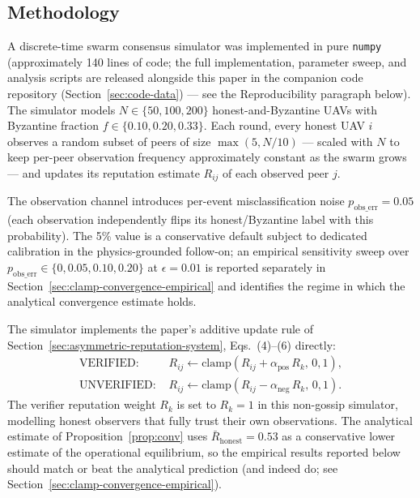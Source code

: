\documentclass[journal,10pt,twocolumn]{IEEEtran}
\begin{document}
\subsection{Methodology}

A discrete-time swarm consensus simulator was implemented in pure
\texttt{numpy} (approximately 140 lines of code; the full implementation,
parameter sweep, and analysis scripts are released alongside this paper
in the companion code repository (Section~\ref{sec:code-data}) --- see the Reproducibility
paragraph below). The simulator models $N\in\{50,100,200\}$ honest-and-Byzantine
UAVs with Byzantine fraction $f\in\{0.10,0.20,0.33\}$. Each round, every
honest UAV $i$ observes a random subset of peers of size
$\max(5, N/10)$ --- scaled with $N$ to keep per-peer observation
frequency approximately constant as the swarm grows --- and updates its
reputation estimate $R_{ij}$ of each observed peer $j$.

The observation channel introduces per-event misclassification noise
$p_\text{obs\_err} = 0.05$ (each observation independently flips its
honest/Byzantine label with this probability). The 5\% value is a
conservative default subject to dedicated calibration in the
physics-grounded follow-on; an empirical sensitivity sweep over
$p_\text{obs\_err}\in\{0,0.05,0.10,0.20\}$ at $\epsilon=0.01$ is
reported separately in Section~\ref{sec:clamp-convergence-empirical}
and identifies the regime in which the analytical convergence
estimate holds.

The simulator implements the paper's additive update rule of
Section~\ref{sec:asymmetric-reputation-system}, Eqs.~(4)--(6) directly:
\begin{align}
\text{VERIFIED: }& R_{ij} \leftarrow \mathrm{clamp}(R_{ij} + \alpha_\text{pos}\, R_k,\, 0, 1), \\
\text{UNVERIFIED: }& R_{ij} \leftarrow \mathrm{clamp}(R_{ij} - \alpha_\text{neg}\, R_k,\, 0, 1).
\end{align}
The verifier reputation weight $R_k$ is set to $R_k=1$ in this
non-gossip simulator, modelling honest observers that fully trust
their own observations. The analytical estimate of
Proposition~\ref{prop:conv} uses $\bar{R}_\text{honest}=0.53$ as a
conservative lower estimate of the operational equilibrium, so the
empirical results reported below should match or beat the analytical
prediction (and indeed do; see Section~\ref{sec:clamp-convergence-empirical}).
\end{document}
